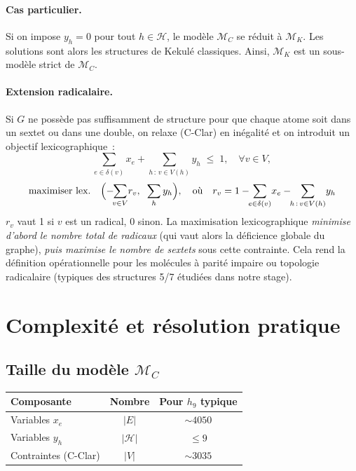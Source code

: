 \documentclass[a4paper,11pt]{article}
\begin{document}
\paragraph{Cas particulier.} Si on impose $y_h = 0$ pour tout $h \in \mathcal{H}$, le mod\`ele
$\mathcal{M}_C$ se r\'eduit \`a $\mathcal{M}_K$. Les solutions sont alors les structures de
Kekul\'e classiques. Ainsi, $\mathcal{M}_K$ est un sous-mod\`ele strict de $\mathcal{M}_C$.

\paragraph{Extension radicalaire.} Si $G$ ne poss\`ede pas suffisamment de structure pour que
chaque atome soit dans un sextet ou dans une double, on relaxe (C-Clar) en in\'egalit\'e et on
introduit un objectif lexicographique~:
\begin{equation}
  \sum_{e \in \delta(v)} x_e + \sum_{h \,:\, v \in V(h)} y_h \;\leq\; 1, \quad \forall v \in V,
\end{equation}
\begin{equation}
  \text{maximiser lex.} \quad
  \Bigl( -\!\!\sum_{v \in V}\! r_v, \;\; \sum_{h} y_h \Bigr),
  \quad \text{o\`u} \quad r_v = 1 - \!\!\sum_{e \in \delta(v)}\! x_e - \!\!\sum_{h \,:\, v \in V(h)}\! y_h
\end{equation}
$r_v$ vaut 1 si $v$ est un radical, 0 sinon. La maximisation lexicographique \emph{minimise
d'abord le nombre total de radicaux} (qui vaut alors la d\'eficience globale du graphe),
\emph{puis maximise le nombre de sextets} sous cette contrainte. Cela rend la d\'efinition
op\'erationnelle pour les mol\'ecules \`a parit\'e impaire ou topologie radicalaire (typiques
des structures 5/7 \'etudi\'ees dans notre stage).

\section{Complexit\'e et r\'esolution pratique}

\subsection*{Taille du mod\`ele $\mathcal{M}_C$}

\begin{center}
\begin{tabular}{lcc}
  \toprule
  Composante & Nombre & Pour $h_9$ typique \\
  \midrule
  Variables $x_e$ & $|E|$ & $\sim 40$\textendash{}$50$ \\
  Variables $y_h$ & $|\mathcal{H}|$ & $\leq 9$ \\
  Contraintes (C-Clar) & $|V|$ & $\sim 30$\textendash{}$35$ \\
  \bottomrule
\end{tabular}
\end{center}
\end{document}
